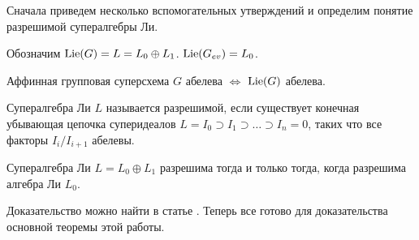 Сначала приведем несколько вспомогательных утверждений и
определим понятие разрешимой супералгебры Ли.

\begin{lemma}\label{Lie(Gev) = L_0}
  Обозначим $ \mathrm{Lie}(G) = L = L_0 \oplus L_1 $. $ \mathrm{Lie}(G_{ev}) = L_0 $.
\end{lemma}

\begin{lemma} \label{abelian G and Lie(G)}
  Аффинная групповая суперсхема $ G $ абелева $ \iff $ $ \mathrm{Lie}(G) $ абелева.
\end{lemma}

\begin{definition}
  Супералгебра Ли $ L $ называется разрешимой, если существует конечная
  убывающая цепочка суперидеалов $ L = I_0 \supset I_1 \supset \ldots \supset I_n = 0 $,
  таких что все факторы $ I_i / I_{i+1} $ абелевы.
\end{definition}

\begin{theorem}[Кац] \label{kac}
  Супералгебра Ли $ L = L_0 \oplus L_1 $ разрешима тогда и только тогда,
  когда разрешима алгебра Ли $ L_0 $.
\end{theorem}
Доказательство можно найти в статье \cite{kac}. Теперь все готово
для доказательства основной теоремы этой работы.

